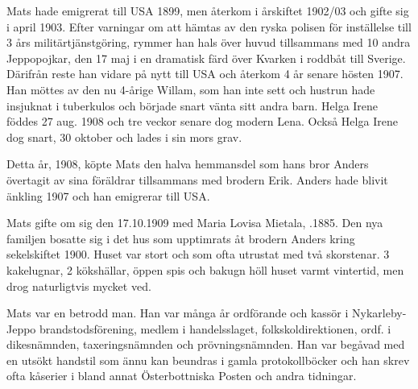 Mats hade emigrerat till USA 1899, men återkom i årskiftet 1902/03 och gifte sig i april 1903. Efter varningar om att hämtas av den ryska polisen för inställelse till 3 års militärtjänstgöring, rymmer han hals över huvud tillsammans med 10 andra Jeppopojkar, den 17 maj i en dramatisk färd över Kvarken i roddbåt till Sverige. Därifrån reste han vidare på nytt till USA och återkom 4 år senare hösten 1907. Han möttes av den nu 4-årige Willam, som han inte sett och  hustrun hade insjuknat i tuberkulos och började snart vänta sitt andra barn. Helga Irene föddes 27 aug. 1908 och tre veckor senare dog modern Lena. Också Helga Irene dog snart, 30 oktober och lades i sin mors grav.

Detta år, 1908, köpte Mats den halva hemmansdel som hans bror Anders övertagit av sina föräldrar tillsammans med brodern Erik. Anders hade blivit änkling 1907 och han emigrerar till USA.



Mats gifte om sig den 17.10.1909 med Maria Lovisa Mietala, .1885. Den nya familjen bosatte sig i det hus som upptimrats åt brodern Anders kring sekelskiftet 1900. Huset var stort och som ofta utrustat med två skorstenar. 3 kakelugnar, 2 kökshällar, öppen spis och bakugn höll huset varmt vintertid, men drog naturligtvis mycket ved.

Mats var en betrodd man. Han var många år ordförande och kassör i Nykarleby-Jeppo brandstodsförening, medlem i handelsslaget, folkskoldirektionen, ordf. i dikesnämnden, taxeringsnämnden och prövningsnämnden. Han var begåvad med en utsökt handstil som ännu kan beundras i gamla protokollböcker och han skrev ofta kåserier i bland annat Österbottniska Posten och andra tidningar.
\begin{jhchildren}
  \item {}
  \item {}
  \item {}
  \item {}
  \item {}
  \item {}
  \item {}
  \item {}
  \item {}
\end{jhchildren}


